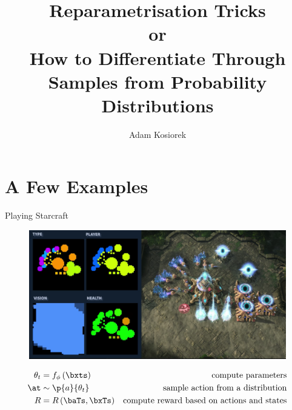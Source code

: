\documentclass{beamer}
\title{Reparametrisation Tricks\\ or\\ How to Differentiate Through Samples from Probability Distributions}
\author{Adam Kosiorek}
\begin{document}
\begin{frame}
	\titlepage
\end{frame}

\section{A Few Examples}
		
	\begin{frame}{Playing Starcraft}
		\begin{figure}
			\centering
			\includegraphics[width=\textwidth]{starcraft}
		\end{figure}

		\begin{equation*}
			\begin{aligned}
				\theta_t &= f_\phi \left( \bxts \right) & \text{compute parameters}\\
				\at &\sim \p{a}{\theta_t} & \text{sample action from a distribution}\\
				R &= R \left( \baTs, \bxTs \right) & \text{compute reward based on actions and states}
			\end{aligned}
		\end{equation*}
	\end{frame}
\end{document}
